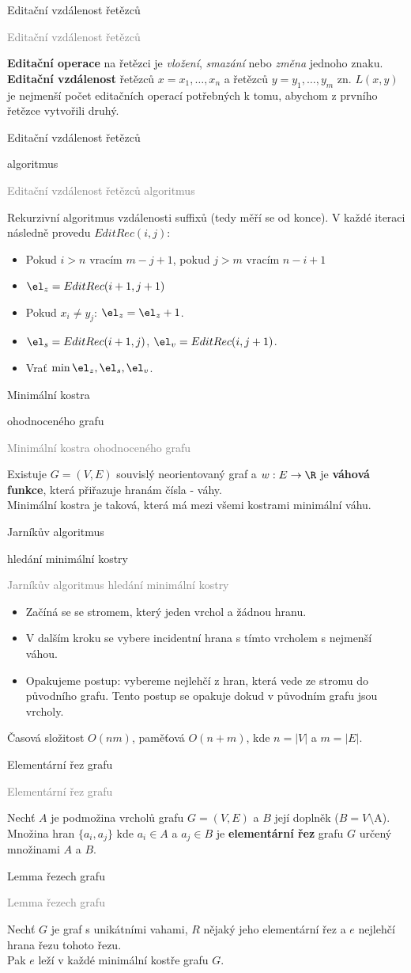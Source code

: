 \documentclass[20pt]{extarticle}
\newcommand{\card}[3][]{
	\vspace*{\fill}

	\newpage
	\topskip0pt
	\vspace*{\fill}
		\Large #2

		\vspace{1cm}
		\normalsize #1
	\vspace*{\fill}
	\newpage

	\small \textcolor{gray}{#2 #1}
	\topskip0pt
	\vspace*{\fill}

	\normalsize
	#3
	\vspace*{\fill}
}
\newcommand{\pair}[2]{\left(#1, #2\right)}
\newcommand{\graph}{G=\pair{V}{E}}
\begin{document}
\begin{center}
\card{Editační vzdálenost řetězců}{
	\textbf{Editační operace} na řetězci je \textit{vložení}, \textit{smazání} nebo
	\textit{změna} jednoho znaku. \textbf{Editační vzdálenost} řetězců $x=x_1, \dots, x_n$
	a řetězců $y=y_1, \dots, y_m$ zn. $L(x, y)$ je nejmenší počet editačních operací
	potřebných k tomu, abychom z prvního řetězce vytvořili druhý.
}

\card[algoritmus]{Editační vzdálenost řetězců}{
	\small
	Rekurzivní algoritmus vzdálenosti suffixů (tedy měří se od konce). V každé iteraci
	následně provedu $EditRec(i,j)$:
	\begin{itemize}
		\item Pokud $i > n$ vracím $m-j+1$, pokud $j > m$ vracím $n-i+1$
		\item $\el_{z} = EditRec(i+1, j+1)$
		\item Pokud $x_i \neq y_j$: $\el_z = \el_z + 1$.
		\item $\el_s = EditRec(i+1, j)$, $\el_v = EditRec(i, j+1)$.
		\item Vrať $\min{\el_z, \el_s, \el_v}$.
	\end{itemize}
}

\card[ohodnoceného grafu]{Minimální kostra}{
	Existuje $\graph$ souvislý neorientovaný graf a $w: E \to \R$ je \textbf{váhová funkce},
	která přiřazuje hranám čísla - váhy.\\
	Minimální kostra je taková, která má mezi všemi kostrami minimální váhu.
}

\card[hledání minimální kostry]{Jarníkův algoritmus}{
	\begin{itemize}
		\item Začíná se se stromem, který jeden vrchol a žádnou hranu.
		\item V dalším kroku se vybere incidentní hrana s tímto vrcholem s nejmenší váhou.
		\item Opakujeme postup: vybereme nejlehčí z hran, která vede ze stromu do původního grafu.
		Tento postup se opakuje dokud v původním grafu jsou vrcholy.
	\end{itemize}
	Časová složitost $O(nm)$, paměťová $O(n+m)$, kde $n=|V|$ a $m=|E|$.
}

\card{Elementární řez grafu}{
	Nechť $A$ je podmožina vrcholů grafu $\graph$ a $B$ její doplněk ($B=V\setminus$A).
	Množina hran $\{a_i, a_j\}$ kde $a_i \in A$ a $a_j \in B$ je \textbf{elementární řez}
	grafu $G$ určený množinami $A$ a $B$.
}

\card{Lemma řezech grafu}{
	Nechť $G$ je graf s unikátními vahami, $R$ nějaký jeho elementární řez a $e$ nejlehčí
	hrana řezu tohoto řezu.\\
	Pak $e$ leží v každé minimální kostře grafu $G$.
}


\end{center}
\end{document}
